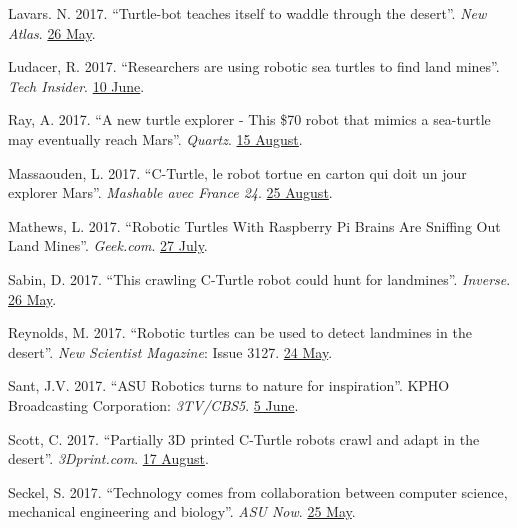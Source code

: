 \documentclass[12pt,a4paper]{article}
\begin{document}
\begin{description}
	\item Lavars. N. 2017. ``Turtle-bot teaches itself to waddle through the desert''. \textit{New Atlas}. \href{https://newatlas.com/turtle-robot-self-learning-waddle/49738/}{26 May}.
	\item Ludacer, R. 2017. ``Researchers are using robotic sea turtles to find land mines''. \textit{Tech Insider}. \href{https://www.facebook.com/techinsider/videos/787578874773804/}{10 June}.
	\item Ray, A. 2017. ``A new turtle explorer - This \$70 robot that mimics a sea-turtle may eventually reach Mars''. \textit{Quartz}. \href{https://qz.com/1053078/this-70-robot-that-mimics-a-sea-turtle-may-eventually-reach-mars/}{15 August}.
	\item Massaouden, L. 2017. ``C-Turtle, le robot tortue en carton qui doit un jour explorer Mars''. \textit{Mashable avec France 24}. \href{http://mashable.france24.com/videos/20170825-c-turtle-robot-tortue-carton-exploration-mars}{25 August}.
	\item Mathews, L. 2017. ``Robotic Turtles With Raspberry Pi Brains Are Sniffing Out Land Mines''. \textit{Geek.com}. \href{https://www.geek.com/tech/robotic-turtles-with-raspberry-pi-brains-are-sniffing-out-land-mines-1709339/}{27 July}.
	\item Sabin, D. 2017. ``This crawling C-Turtle robot could hunt for landmines''. \textit{Inverse}. \href{https://www.inverse.com/article/32219-cturtle-robot-sea-turtle-mines}{26 May}.
	\item Reynolds, M. 2017. ``Robotic turtles can be used to detect landmines in the desert''. \textit{New Scientist Magazine}: Issue 3127. \href{https://www.newscientist.com/article/mg23431274-200-robotic-turtles-can-be-used-to-detect-landmines-in-the-desert/}{24 May}.
	\item Sant, J.V. 2017. ``ASU Robotics turns to nature for inspiration''. KPHO Broadcasting Corporation: \textit{3TV/CBS5}. \href{http://www.azfamily.com/story/35595946/asu-robotics-turns-to-nature-for-inspiration}{5 June}.
	\item Scott, C. 2017. ``Partially 3D printed C-Turtle robots crawl and adapt in the desert''. \textit{3Dprint.com}. \href{https://3dprint.com/184523/3d-printed-c-turtle-robots/}{17 August}.
	\item Seckel, S. 2017. ``Technology comes from collaboration between computer science, mechanical engineering and biology''. \textit{ASU Now}. \href{https://asunow.asu.edu/20170525-solutions-asu-designed-c-turtle-robot-teaches-itself-get-around}{25 May}.

\end{description}
\end{document}
